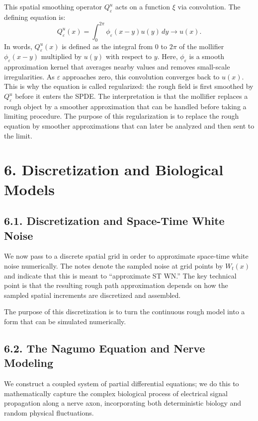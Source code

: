 \documentclass[11pt]{article}
\theoremstyle{definition}
\theoremstyle{remark}
\begin{document}
This spatial smoothing operator $Q_{\varepsilon}^u$ acts on a function $\xi$ via convolution. The defining equation is:
\[
Q_{\varepsilon}^u(x)=\int_0^{2\pi}\phi_{\varepsilon}(x-y)u(y)\,dy\to u(x).
\]
In words, $Q_{\varepsilon}^u(x)$ is defined as the integral from $0$ to $2\pi$ of the mollifier $\phi_{\varepsilon}(x-y)$ multiplied by $u(y)$ with respect to $y$. Here, $\phi_{\varepsilon}$ is a smooth approximation kernel that averages nearby values and removes small-scale irregularities. As $\varepsilon$ approaches zero, this convolution converges back to $u(x)$. This is why the equation is called regularized: the rough field is first smoothed by $Q_{\varepsilon}^u$ before it enters the SPDE.
The interpretation is that the mollifier replaces a rough object by a smoother approximation that can be handled before taking a limiting procedure.
The purpose of this regularization is to replace the rough equation by smoother approximations that can later be analyzed and then sent to the limit.


\section*{6. Discretization and Biological Models}
\subsection*{6.1. Discretization and Space-Time White Noise}
We now pass to a discrete spatial grid in order to approximate space-time white noise numerically. The notes denote the sampled noise at grid points by $W_t(x)$ and indicate that this is meant to ``approximate ST WN.'' The key technical point is that the resulting rough path approximation depends on how the sampled spatial increments are discretized and assembled.

The purpose of this discretization is to turn the continuous rough model into a form that can be simulated numerically.

\subsection*{6.2. The Nagumo Equation and Nerve Modeling}
We construct a coupled system of partial differential equations; we do this to mathematically capture the complex biological process of electrical signal propagation along a nerve axon, incorporating both deterministic biology and random physical fluctuations.
\end{document}
